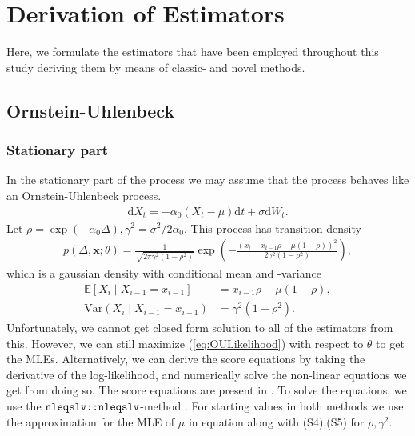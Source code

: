 \section{Derivation of Estimators}
Here, we formulate the estimators that have been employed throughout this study deriving them by means of classic- and novel methods.
\subsection{Ornstein-Uhlenbeck}\label{subsec:OUprocess}
\subsubsection{Stationary part}\label{subsubsec:OUprocessStationary}
In the stationary part of the process we may assume that the process behaves like an Ornstein-Uhlenbeck process. 
\begin{align}
    \mathrm{d}X_t = -\alpha_0\left(X_t-\mu\right) \mathrm{d}t + \sigma \mathrm{d}W_t.
\end{align}
Let $\rho = \exp\left(-\alpha_0\Delta\right), \gamma^2 = \sigma^2/2\alpha_0$. This process has transition density 
\begin{align}
    p\left(\Delta, \mathbf{x};\theta\right) = \frac{1}{\sqrt{2\pi\gamma^2\left(1-\rho^2\right)}}\exp\left(-\frac{\left(x_i-x_{i-1}\rho - \mu\left(1-\rho\right)\right)^2}{2\gamma^2\left(1-\rho^2\right)}\right), \label{eq:OULikelihood}
\end{align}
which is a gaussian density with conditional mean and -variance
\begin{align}
    \mathbb{E}\left[X_i\middle|X_{i-1} = x_{i-1}\right] &= x_{i - 1}\rho - \mu\left(1-\rho\right),\\
    \mathrm{Var}\left(X_i\middle|X_{i-1} = x_{i-1}\right) &= \gamma^2\left(1-\rho^2\right).
\end{align}
Unfortunately, we cannot get closed form solution to all of the estimators from this. However, we can still maximize (\ref{eq:OULikelihood}) with respect to $\theta$ to get the MLEs. Alternatively, we can derive the score equations by taking the derivative of the log-likelihood, and numerically solve the non-linear equations we get from doing so. The score equations are present in \cite{DitlevsenSupplementary}. To solve the equations, we use the $\texttt{nleqslv::nleqslv}$-method \cite{nleqslv}. For starting values in both methods we use the approximation for the MLE of $\mu$ in equation \cite[(S4)]{DitlevsenSupplementary} along with (S4),(S5) for $\rho, \gamma^2$. 
